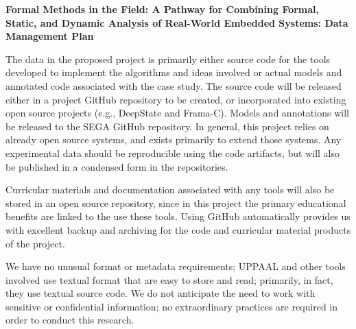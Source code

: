 \documentclass{article}
\begin{document}
\begin{center}
{\Large\sf\textbf{Formal Methods in the Field: A Pathway for Combining Formal, Static,
    and Dynamic Analysis of Real-World Embedded Systems: Data Management Plan}}
\end{center}

The data in the proposed project is primarily either source code for
the tools developed to implement the algorithms and ideas involved or
actual models and annotated code associated with the case study.  The source code will be released either in a project GitHub repository to be created, or incorporated into existing open source projects (e.g., DeepState and Frama-C).  Models and annotations will be released to the SEGA GitHub repository.  In general, this project relies on already open source systems, and exists primarily to extend those systems.  Any experimental data should be reproducible using the code artifacts, but will also be published in a condensed form in the repositories.

Curricular
materials and documentation associated with any tools will also be stored in
an open source repository, since in this project the primary
educational benefits are linked to the use these tools.  Using GitHub automatically provides us with excellent backup
and archiving for the code and curricular material products of the
project.

We have no unusual format or metadata requirements; UPPAAL and other
tools involved use textual format that are easy to store and read;
primarily, in fact, they use textual source code.
We do not anticipate the need to work with sensitive or confidential
information; no extraordinary practices are required in order to
conduct this research.
\end{document}
